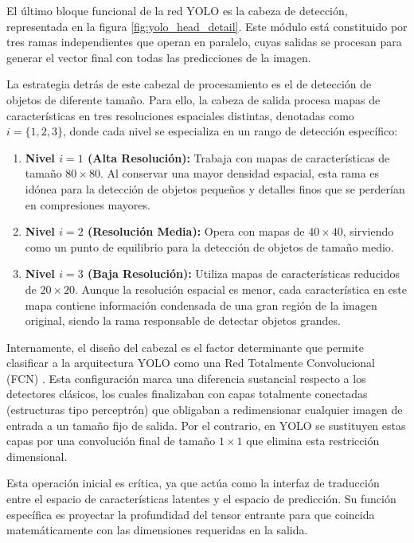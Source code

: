 \documentclass{article}
\begin{document}
	El último bloque funcional de la red YOLO es la cabeza de detección, representada en la figura \ref{fig:yolo_head_detail}. Este módulo está constituido por tres ramas independientes que operan en paralelo, cuyas salidas se procesan para generar el vector final con todas las predicciones de la imagen.
	
	
	La estrategia detrás de este cabezal de procesamiento es el de detección de objetos de diferente tamaño.  Para ello, la cabeza de salida procesa mapas de características en tres resoluciones espaciales distintas, denotadas como $i=\{1, 2, 3\}$, donde cada nivel se especializa en un rango de detección específico:
	\begin{enumerate}
		\item \textbf{Nivel $i=1$ (Alta Resolución):} Trabaja con mapas de características de tamaño $80 \times 80$. Al conservar una mayor densidad espacial, esta rama es idónea para la detección de objetos pequeños y detalles finos que se perderían en compresiones mayores.
		\item \textbf{Nivel $i=2$ (Resolución Media):} Opera con mapas de $40 \times 40$, sirviendo como un punto de equilibrio para la detección de objetos de tamaño medio.
		\item \textbf{Nivel $i=3$ (Baja Resolución):} Utiliza mapas de características reducidos de $20 \times 20$. Aunque la resolución espacial es menor, cada característica en este mapa contiene información condensada de una gran región de la imagen original, siendo la rama responsable de detectar objetos grandes.
	\end{enumerate}
	
	Internamente, el diseño del cabezal es el factor determinante que permite clasificar a la arquitectura YOLO como una Red Totalmente Convolucional (FCN) \cite{long2015fullyconvolutionalnetworkssemantic}. Esta configuración marca una diferencia sustancial respecto a los detectores clásicos, los cuales finalizaban con capas totalmente conectadas (estructuras tipo perceptrón) que obligaban a redimensionar cualquier imagen de entrada a un tamaño fijo de salida. Por el contrario, en YOLO se sustituyen estas capas por una convolución final de tamaño $1\times1$ que elimina esta restricción dimensional.
	
	
	Esta operación inicial es crítica, ya que actúa como la interfaz de traducción entre el espacio de características latentes y el espacio de predicción. Su función específica es proyectar la profundidad del tensor entrante para que coincida matemáticamente con las dimensiones requeridas en la salida. 
	
\end{document}
